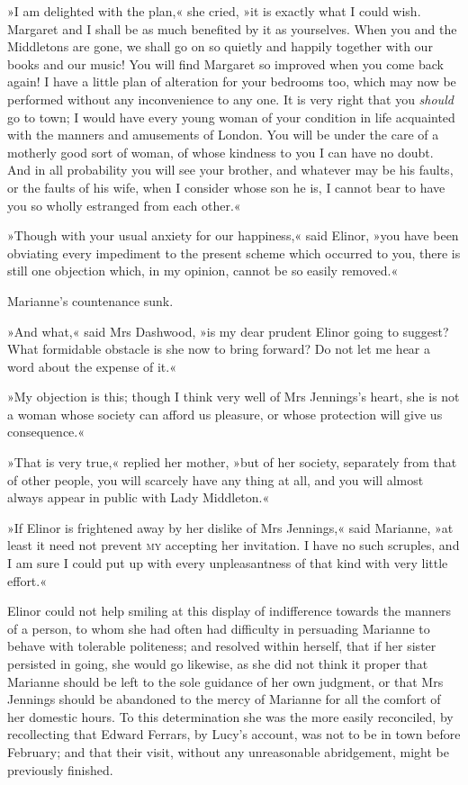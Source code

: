 »I am delighted with the plan,« she cried, »it is exactly what I could wish. Margaret and I shall be as much benefited by it as yourselves. When you and the Middletons are gone, we shall go on so quietly and happily together with our books and our music! You will find Margaret so improved when you come back again! I have a little plan of alteration for your bedrooms too, which may now be performed without any inconvenience to any one. It is very right that you \textit{should} go to town; I would have every young woman of your condition in life acquainted with the manners and amusements of London. You will be under the care of a motherly good sort of woman, of whose kindness to you I can have no doubt. And in all probability you will see your brother, and whatever may be his faults, or the faults of his wife, when I consider whose son he is, I cannot bear to have you so wholly estranged from each other.«

»Though with your usual anxiety for our happiness,« said Elinor, »you have been obviating every impediment to the present scheme which occurred to you, there is still one objection which, in my opinion, cannot be so easily removed.«

Marianne’s countenance sunk.

»And what,« said Mrs Dashwood, »is my dear prudent Elinor going to suggest? What formidable obstacle is she now to bring forward? Do not let me hear a word about the expense of it.«

»My objection is this; though I think very well of Mrs Jennings’s heart, she is not a woman whose society can afford us pleasure, or whose protection will give us consequence.«

»That is very true,« replied her mother, »but of her society, separately from that of other people, you will scarcely have any thing at all, and you will almost always appear in public with Lady Middleton.«

»If Elinor is frightened away by her dislike of Mrs Jennings,« said Marianne, »at least it need not prevent \textsc{my} accepting her invitation. I have no such scruples, and I am sure I could put up with every unpleasantness of that kind with very little effort.«

Elinor could not help smiling at this display of indifference towards the manners of a person, to whom she had often had difficulty in persuading Marianne to behave with tolerable politeness; and resolved within herself, that if her sister persisted in going, she would go likewise, as she did not think it proper that Marianne should be left to the sole guidance of her own judgment, or that Mrs Jennings should be abandoned to the mercy of Marianne for all the comfort of her domestic hours. To this determination she was the more easily reconciled, by recollecting that Edward Ferrars, by Lucy’s account, was not to be in town before February; and that their visit, without any unreasonable abridgement, might be previously finished.

